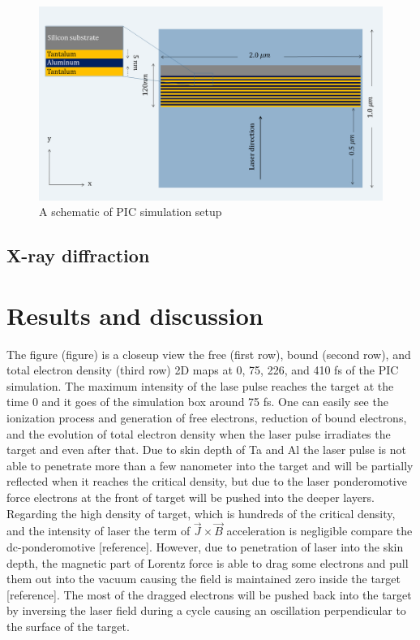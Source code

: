 \documentclass[preprint, 12pt]{elsarticle}
\begin{document}
\begin{figure}[h]
\centering\includegraphics[width=0.8\linewidth]{P_2.png}
\caption{A schematic of PIC simulation setup}
\end{figure}

\subsection{X-ray diffraction}

\section{Results and discussion}
The figure (figure) is a closeup view the free (first row), bound (second row), and total electron density (third row) 2D maps at 0, 75, 226, and 410 fs of the PIC simulation. The maximum intensity of the lase pulse reaches the target at the time 0 and it goes of the simulation box around 75 fs. One can easily see the ionization process and generation of free electrons, reduction of bound electrons, and the evolution of total electron density when the laser pulse irradiates the target and even after that. Due to skin depth of Ta and Al the laser pulse is not able to penetrate more than a few nanometer into the target and will be partially reflected when it reaches the critical density, but due to the laser ponderomotive force electrons at the front of target will be pushed into the deeper layers. Regarding the high density of target, which is hundreds of the critical density, and the intensity of laser the term of $\vec{J} \times \vec{B}$ acceleration is negligible compare the dc-ponderomotive [reference]. However, due to penetration of laser into the skin depth, the magnetic part of Lorentz force is able to drag some electrons and pull them out into the vacuum causing the field is maintained zero inside the target [reference]. The most of the dragged electrons will be pushed back into the target by inversing the laser field during a cycle causing an oscillation perpendicular to the surface of the target.
\end{document}
